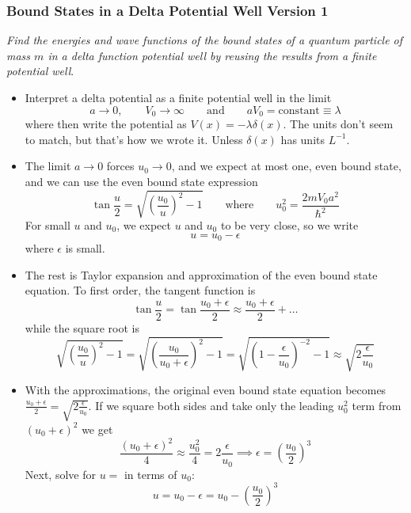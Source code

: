 \documentclass[11pt, a4paper]{article}
\newcommand{\eqtext}[1]{\qquad \text{#1} \qquad}
\begin{document}
\subsubsection{Bound States in a Delta Potential Well Version 1}
\textit{Find the energies and wave functions of the bound states of a quantum particle of mass $ m $ in a delta function potential well by reusing the results from a finite potential well}. 
\begin{itemize}
	\item Interpret a delta potential as a finite potential well in the limit 
	\begin{equation*}
		a \to 0, \qquad V_{0} \to \infty \eqtext{and} aV_{0} = \text{constant} \equiv \lambda 
	\end{equation*}
	where then write the potential as $ V(x) = - \lambda \delta(x) $. The units don't seem to match, but that's how we wrote it. Unless $ \delta(x) $ has units $ L^{-1} $. 
	
	\item The limit $ a \to 0 $ forces $ u_{0} \to 0 $, and we expect at most one, even bound state, and we can use the even bound state expression
	\begin{equation*}
		\tan \frac{u}{2} = \sqrt{\left(\frac{u_{0}}{u}\right)^{2} -1} \eqtext{where} u_{0}^{2} = \frac{2mV_{0}a^{2}}{\hbar^{2}}
	\end{equation*}
	For small $ u $ and $ u_{0} $, we expect $ u $ and $ u_{0} $ to be very close, so we write
	\begin{equation*}
		u = u_{0} - \epsilon
	\end{equation*}
	where $ \epsilon $ is small. 
	
	\item The rest is Taylor expansion and approximation of the even bound state equation. To first order, the tangent function is
	\begin{equation*}
		\tan \frac{u}{2} = \tan \frac{u_{0} + \epsilon}{2} \approx \frac{u_{0} + \epsilon}{2} + \dots 
	\end{equation*}
	while the square root is
	\begin{equation*}
		\sqrt{\left(\frac{u_{0}}{u}\right)^{2} -1} = \sqrt{\left(\frac{u_{0}}{u_{0} + \epsilon}\right)^{2} -1} = \sqrt{\left(1 - \frac{\epsilon}{u_{0}}\right)^{-2} -1} \approx \sqrt{2\frac{\epsilon}{u_{0}}}
	\end{equation*}
	
	
	\item With the approximations, the original even bound state equation becomes $ \frac{u_{0} + \epsilon}{2} = \sqrt{2\frac{\epsilon}{u_{0}}} $. If we square both sides and take only the leading $ u_{0}^{2} $ term from $ (u_{0} + \epsilon)^{2} $ we get
	\begin{equation*}
		\frac{ (u_{0} + \epsilon)^{2}}{4} \approx \frac{u_{0}^{2}}{4} = 2 \frac{\epsilon}{u_{0}} \implies \epsilon = \left(\frac{u_{0}}{2}\right)^{3}
	\end{equation*}
	Next, solve for $ u = $ in terms of $ u_{0} $:
	\begin{equation*}
		u = u_{0} - \epsilon = u_{0} - \left(\frac{u_{0}}{2}\right)^{3}
	\end{equation*}
	

\end{itemize}
\end{document}
